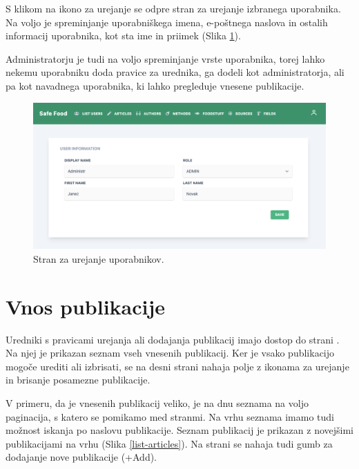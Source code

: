 \documentclass[a4paper, 12pt]{book}
\begin{document}
S klikom na ikono za urejanje se odpre stran za urejanje izbranega uporabnika. Na voljo je spreminjanje uporabniškega imena, e-poštnega naslova in ostalih informacij uporabnika, kot sta ime in priimek (Slika \ref{users-edit-page}).

Administratorju je tudi na voljo spreminjanje vrste uporabnika, torej lahko nekemu uporabniku doda pravice za urednika, ga dodeli kot administratorja, ali pa kot navadnega uporabnika, ki lahko pregleduje vnesene publikacije.

\begin{figure}[h]
\begin{center}
\includegraphics[width=1\textwidth]{slike/users-edit.png}
\end{center}
\caption{ Stran za urejanje uporabnikov. }
\label{users-edit-page}
\end{figure}


\section{Vnos publikacije}
Uredniki s pravicami urejanja ali dodajanja publikacij imajo dostop do strani . Na njej je prikazan seznam vseh vnesenih publikacij. Ker je vsako publikacijo mogoče urediti ali izbrisati, se na desni strani nahaja polje z ikonama za urejanje in brisanje posamezne publikacije.

V primeru, da je vnesenih publikacij veliko, je na dnu seznama na voljo paginacija, s katero se pomikamo med stranmi. Na vrhu seznama imamo tudi možnost iskanja po naslovu publikacije. Seznam publikacij je prikazan z novejšimi publikacijami na vrhu (Slika \ref{list-articles}). Na strani se nahaja tudi gumb za dodajanje nove publikacije (+Add).
\end{document}
